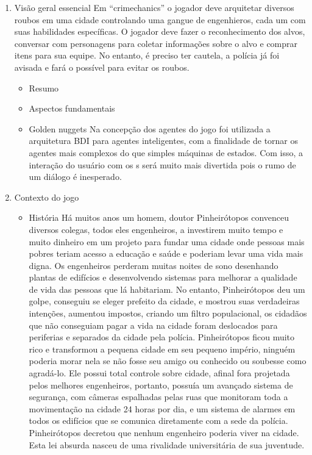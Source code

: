 \begin{enumerate}
\item Visão geral essencial
Em ``crimechanics'' o jogador deve arquitetar diversos roubos em uma cidade controlando uma gangue de engenhieros, cada um com suas habilidades específicas. O jogador deve fazer o reconhecimento dos alvos, conversar com personagens para coletar informações sobre o alvo e comprar itens para sua equipe. No entanto, é preciso ter cautela, a polícia já foi avisada e fará o possível para evitar os roubos.
\begin{itemize}
\item Resumo
\item Aspectos fundamentais
\item Golden nuggets
Na concepção dos agentes do jogo foi utilizada a arquitetura BDI para agentes inteligentes, com a finalidade de tornar os agentes mais complexos do que simples máquinas de estados. Com isso, a interação do usuário com os \npc{}s será muito mais divertida pois o rumo de um diálogo é inesperado.
\end{itemize}
\item Contexto do jogo
\begin{itemize}
\item História
Há muitos anos um homem, doutor Pinheirótopos convenceu diversos colegas, todos eles engenheiros, a investirem muito tempo e muito dinheiro em um projeto para fundar uma cidade onde pessoas mais pobres teriam acesso a educação e saúde e poderiam levar uma vida mais digna. Os engenheiros perderam muitas noites de sono desenhando plantas de edifícios e desenvolvendo sistemas para melhorar a qualidade de vida das pessoas que lá habitariam. 
No entanto, Pinheirótopos deu um golpe, conseguiu se eleger prefeito da cidade, e mostrou suas verdadeiras intenções, aumentou impostos, criando um filtro populacional, os cidadãos que não conseguiam pagar a vida na cidade foram deslocados para periferias e separados da cidade pela polícia.
Pinheirótopos ficou muito rico e transformou a pequena cidade em seu pequeno império, ninguém poderia morar nela se não fosse seu amigo ou conhecido ou soubesse como agradá-lo. Ele possui total controle sobre cidade, afinal fora projetada pelos melhores engenheiros, portanto, possuía um avançado sistema de segurança, com câmeras espalhadas pelas ruas que monitoram toda a movimentação na cidade 24 horas por dia, e um sistema de alarmes em todos os edifícios que se comunica diretamente com a sede da polícia.
Pinheirótopos decretou que nenhum engenheiro poderia viver na cidade. Esta lei absurda nasceu de uma rivalidade universitária de sua juventude.

\end{itemize}
\end{enumerate}

